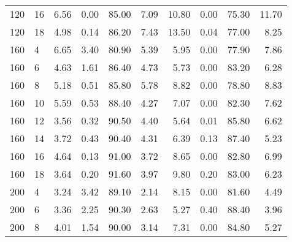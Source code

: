 \begin{table*}[h]
\begin{center}
\begin{tabular} {l l | r r r r | r r r r }
120  &             16  &  6.56   &            0.00             &               85.00  &  7.09   &  10.80  &            0.00             &               75.30  &  11.70  \\
120  &             18  &  4.98   &            0.14             &               86.20  &  7.43   &  13.50  &            0.04             &               77.00  &  8.25   \\
160  &             4   &  6.65   &            3.40             &               80.90  &  5.39   &  5.95   &            0.00             &               77.90  &  7.86   \\
160  &             6   &  4.63   &            1.61             &               86.40  &  4.73   &  5.73   &            0.00             &               83.20  &  6.28   \\
160  &             8   &  5.18   &            0.51             &               85.80  &  5.78   &  8.82   &            0.00             &               78.80  &  8.83   \\
160  &             10  &  5.59   &            0.53             &               88.40  &  4.27   &  7.07   &            0.00             &               82.30  &  7.62   \\
160  &             12  &  3.56   &            0.32             &               90.50  &  4.40   &  5.64   &            0.01             &               85.80  &  6.62   \\
160  &             14  &  3.72   &            0.43             &               90.40  &  4.31   &  6.39   &            0.13             &               87.40  &  5.23   \\
160  &             16  &  4.64   &            0.13             &               91.00  &  3.72   &  8.65   &            0.00             &               82.80  &  6.99   \\
160  &             18  &  3.64   &            0.20             &               91.60  &  3.97   &  9.80   &            0.20             &               83.00  &  6.23   \\
200  &             4   &  3.24   &            3.42             &               89.10  &  2.14   &  8.15   &            0.00             &               81.60  &  4.49   \\
200  &             6   &  3.36   &            2.25             &               90.30  &  2.63   &  5.27   &            0.40             &               88.40  &  3.96   \\
200  &             8   &  4.01   &            1.54             &               90.00  &  3.14   &  7.31   &            0.00             &               84.80  &  5.27   \\

\end{tabular}
\end{center}
\end{table*}
